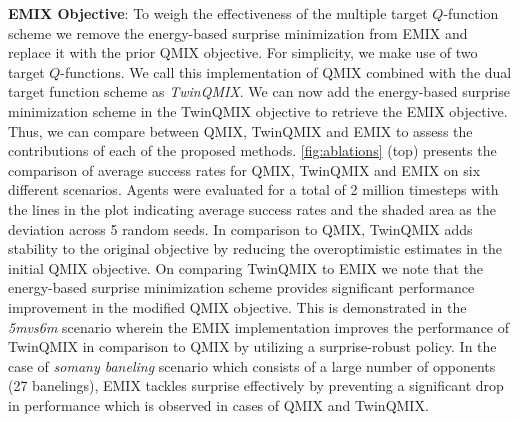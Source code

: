 \documentclass{article}
\begin{document}
\begin{multicols}{2}
\textbf{EMIX Objective}: To weigh the effectiveness of the multiple target $Q$-function scheme we remove the energy-based surprise minimization from EMIX and replace it with the prior QMIX objective. For simplicity, we make use of two target $Q$-functions. We call this implementation of QMIX combined with the dual target function scheme as \textit{TwinQMIX}. We can now add the energy-based surprise minimization scheme in the TwinQMIX objective to retrieve the EMIX objective. Thus, we can compare between QMIX, TwinQMIX and EMIX to assess the contributions of each of the proposed methods. \autoref{fig:ablations} (top) presents the comparison of average success rates for QMIX, TwinQMIX and EMIX on six different scenarios. Agents were evaluated for a total of 2 million timesteps with the lines in the plot indicating average success rates and the shaded area as the deviation across 5 random seeds. In comparison to QMIX, TwinQMIX adds stability to the original objective by reducing the overoptimistic estimates in the initial QMIX objective. On comparing TwinQMIX to EMIX we note that the energy-based surprise minimization scheme provides significant performance improvement in the modified QMIX objective. This is demonstrated in the \textit{5m\textunderscore vs\textunderscore 6m} scenario wherein the EMIX implementation improves the performance of TwinQMIX in comparison to QMIX by utilizing a surprise-robust policy. In the case of \textit{so\textunderscore many \textunderscore baneling} scenario which consists of a large number of opponents (27 banelings), EMIX tackles surprise effectively by preventing a significant drop in performance which is observed in cases of QMIX and TwinQMIX.


\end{multicols}
\end{document}
